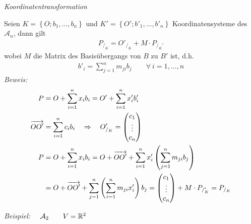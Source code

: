 \begin{mysatz} \textit{Koordinatentransformation}

    Seien $K = \left\{ O; b_1, \ldots, b_n \right\}$ und $K' = \left\{ O'; b'_1, \ldots, b'_n \right\}$ Koordinatensysteme des $\mathcal{A}_n$, dann gilt
    \begin{align*}
        P_{/_K} = O'_{/_K} + M \cdot P_{/_K'}
    \end{align*}
    wobei $M$ die Matrix des Basisübergangs von $B$ zu $B'$ ist, d.h.
    \begin{align*}
        b'_i = \sum\limits_{j=1}^{n} m_{ji} b_{j} \qquad \forall\ i = 1, \ldots, n
    \end{align*}
    \textit{Beweis:}
    \begin{align*}
        P & = O + \sum\limits_{i=1}^{n} x_i b_i = O' + \sum\limits_{i=1}^{n} x'_i b'_i\\
        \overrightarrow{OO'} & = \sum\limits_{i=1}^{n} c_i b_i \quad \Rightarrow \quad O'_{/_K} =
            \begin{pmatrix}
                c_1\\ \vdots\\ c_n
            \end{pmatrix}\\
            P & = O + \sum\limits_{i = 1}^{n} x_i b_i = O + \overrightarrow{OO'} + \sum\limits_{i=1}^{n} x'_i \left( \sum\limits_{j=1}^{n} m_{ji} b_{j} \right)\\
            & = O + \overrightarrow{OO'} + \sum\limits_{j=1}^{n} \left( \sum\limits_{i=1}^{n} m_{ji} x'_i \right) b_j =
            \begin{pmatrix}
                c_1\\ \vdots\\ c_n
            \end{pmatrix}
            + M \cdot P_{/_K'} = P_{/_K}
    \end{align*}
\end{mysatz}

\textit{Beispiel:} $\quad \mathcal{A}_2 \qquad V = \mathbb{R}^2$

